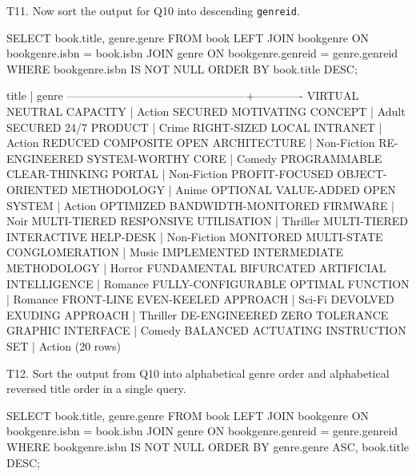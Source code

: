 T11. Now sort the output for Q10 into descending \verb|genreid|.
\begin{sql}
SELECT book.title, genre.genre FROM book
LEFT JOIN bookgenre ON bookgenre.isbn = book.isbn
JOIN genre ON bookgenre.genreid = genre.genreid
WHERE bookgenre.isbn IS NOT NULL
ORDER BY book.title DESC;
\end{sql}

\begin{pseudo}
                     title                      |    genre
------------------------------------------------+-------------
 VIRTUAL NEUTRAL CAPACITY                       | Action
 SECURED MOTIVATING CONCEPT                     | Adult
 SECURED 24/7 PRODUCT                           | Crime
 RIGHT-SIZED LOCAL INTRANET                     | Action
 REDUCED COMPOSITE OPEN ARCHITECTURE            | Non-Fiction
 RE-ENGINEERED SYSTEM-WORTHY CORE               | Comedy
 PROGRAMMABLE CLEAR-THINKING PORTAL             | Non-Fiction
 PROFIT-FOCUSED OBJECT-ORIENTED METHODOLOGY     | Anime
 OPTIONAL VALUE-ADDED OPEN SYSTEM               | Action
 OPTIMIZED BANDWIDTH-MONITORED FIRMWARE         | Noir
 MULTI-TIERED RESPONSIVE UTILISATION            | Thriller
 MULTI-TIERED INTERACTIVE HELP-DESK             | Non-Fiction
 MONITORED MULTI-STATE CONGLOMERATION           | Music
 IMPLEMENTED INTERMEDIATE METHODOLOGY           | Horror
 FUNDAMENTAL BIFURCATED ARTIFICIAL INTELLIGENCE | Romance
 FULLY-CONFIGURABLE OPTIMAL FUNCTION            | Romance
 FRONT-LINE EVEN-KEELED APPROACH                | Sci-Fi
 DEVOLVED EXUDING APPROACH                      | Thriller
 DE-ENGINEERED ZERO TOLERANCE GRAPHIC INTERFACE | Comedy
 BALANCED ACTUATING INSTRUCTION SET             | Action
(20 rows)
\end{pseudo}

T12. Sort the output from Q10 into alphabetical genre order and alphabetical  reversed title order in a single query.
\begin{sql}
SELECT book.title, genre.genre FROM book
LEFT JOIN bookgenre ON bookgenre.isbn = book.isbn
JOIN genre ON bookgenre.genreid = genre.genreid
WHERE bookgenre.isbn IS NOT NULL
ORDER BY genre.genre ASC, book.title DESC;
\end{sql}

